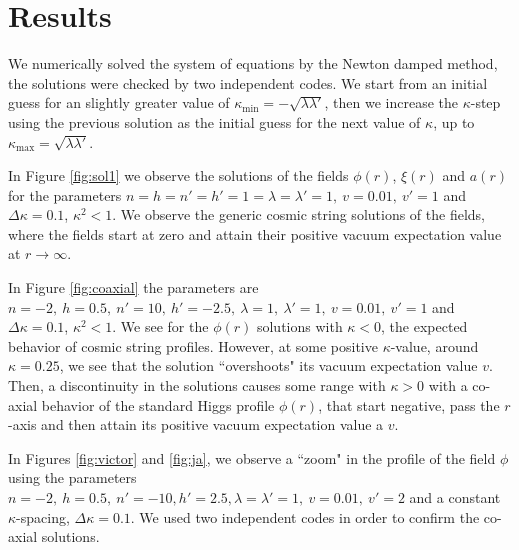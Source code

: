 \documentclass[12pt,a4paper]{article}
\begin{document}
%
\section{Results}
We numerically solved the system of equations by the Newton damped method, the solutions were checked by two independent codes. We start from an initial guess for an slightly greater value of $\kappa_{\text{min}}=-\sqrt{\lambda\lambda'}$, then we increase the $\kappa$-step using the previous solution as the initial guess for the next value of $\kappa$, up to $\kappa_{\text{max}}=\sqrt{\lambda\lambda'}$. 



In Figure \ref{fig:sol1} we observe the solutions of the fields $\phi(r)$, $\xi(r)$ and $a(r)$ for the parameters $n = h = n' = h' = 1 = \lambda=\lambda' = 1,\ v =0.01,\ v' = 1 $ and $\Delta \kappa = 0.1$, $\kappa^2<1$. We observe the generic cosmic string solutions of the fields, where the fields start at zero and attain their positive vacuum expectation value at $r\to\infty$. 

In Figure \ref{fig:coaxial} the parameters are $n = -2,\ h =0.5,\ n' = 10,\ h' = -2.5,\  \lambda=1,\ \lambda' = 1,\ v =0.01,\ v' = 1 $ and $\Delta \kappa = 0.1$, $\kappa^2<1$. We see for the $\phi(r)$ solutions with $\kappa<0$, the expected behavior of cosmic string profiles. However, at some positive $\kappa$-value, around $\kappa=0.25$, we see that the solution ``overshoots" its vacuum expectation value $v$. Then, a discontinuity in the solutions causes some range with $\kappa>0$ with a co-axial behavior of the standard Higgs profile $\phi(r)$, that start negative, pass the $r$-axis and then attain its positive vacuum expectation value a $v$.

In Figures \ref{fig:victor} and \ref{fig:ja}, we observe a ``zoom" in the profile of the field $\phi$ using the parameters  $n = -2,\  h = 0.5,\ n' = -10, h' = 2.5, \lambda=\lambda' = 1,\ v =0.01,\ v' = 2 $ and a constant $\kappa$-spacing, $\Delta\kappa = 0.1$. We used two independent codes in order to confirm the co-axial solutions.
\end{document}
